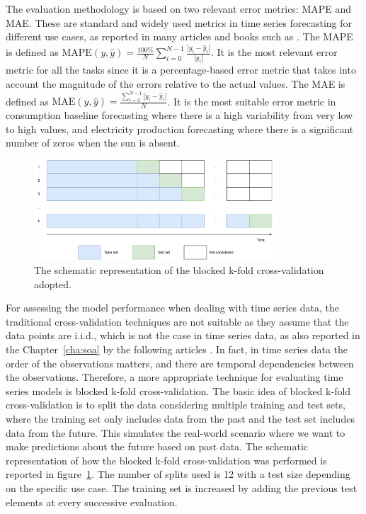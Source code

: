 The evaluation methodology is based on two relevant error metrics: MAPE and MAE.
These are standard and widely used metrics in time series forecasting for different use cases, as reported in many articles and books such as \cite{armstrong2001principles, DEGOOIJER2006443, HYNDMAN2006679}.
The MAPE is defined as $\text{MAPE}(y, \hat{y}) = \frac{100\%}{N} \sum_{i=0}^{N - 1} \frac{|y_i - \hat{y}_i|}{|y_i|}$.
It is the most relevant error metric for all the tasks since it is a percentage-based error metric that takes into account the magnitude of the errors relative to the actual values.
The MAE is defined as $\text{MAE}(y, \hat{y}) = \frac{ \sum_{i=0}^{N - 1} |y_i - \hat{y}_i| }{N}$.
It is the most suitable error metric in consumption baseline forecasting where there is a high variability from very low to high values, and electricity production forecasting where there is a significant number of zeros when the sun is absent.

\begin{figure}[H]
\centering
\includegraphics[width=0.8\textwidth]{images/cross_validation}
\caption{The schematic representation of the blocked k-fold cross-validation adopted.}
\label{fig:crossvalidation}
\end{figure}

For assessing the model performance when dealing with time series data, the traditional cross-validation techniques are not suitable as they assume that the data points are i.i.d., which is not the case in time series data, as also reported in the Chapter~\ref{cha:soa} by the following articles \cite{BERGMEIR2012192, Cerqueira2020}.
In fact, in time series data the order of the observations matters, and there are temporal dependencies between the observations.
Therefore, a more appropriate technique for evaluating time series models is blocked k-fold cross-validation.
The basic idea of blocked k-fold cross-validation is to split the data considering multiple training and test sets, where the training set only includes data from the past and the test set includes data from the future.
This simulates the real-world scenario where we want to make predictions about the future based on past data.
The schematic representation of how the blocked k-fold cross-validation was performed is reported in figure~\ref{fig:crossvalidation}.
The number of splits used is 12 with a test size depending on the specific use case.
The training set is increased by adding the previous test elements at every successive evaluation.

